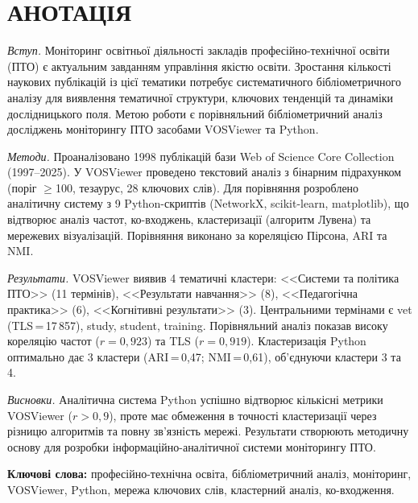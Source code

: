 \section*{\centering \MakeUppercase{Анотація}}

\textit{Вступ.} Моніторинг освітньої діяльності закладів професійно-технічної освіти (ПТО) є актуальним завданням управління якістю освіти. Зростання кількості наукових публікацій із цієї тематики потребує систематичного бібліометричного аналізу для виявлення тематичної структури, ключових тенденцій та динаміки дослідницького поля. Метою роботи є порівняльний бібліометричний аналіз досліджень моніторингу ПТО засобами VOSViewer та Python.

\textit{Методи.} Проаналізовано 1998 публікацій бази Web of Science Core Collection (1997--2025). У VOSViewer проведено текстовий аналіз з бінарним підрахунком (поріг $\geq$100, тезаурус, 28 ключових слів). Для порівняння розроблено аналітичну систему з 9 Python-скриптів (NetworkX, scikit-learn, matplotlib), що відтворює аналіз частот, ко-входжень, кластеризації (алгоритм Лувена) та мережевих візуалізацій. Порівняння виконано за кореляцією Пірсона, ARI та NMI.

\textit{Результати.} VOSViewer виявив 4 тематичні кластери: <<Системи та політика ПТО>> (11 термінів), <<Результати навчання>> (8), <<Педагогічна практика>> (6), <<Когнітивні результати>> (3). Центральними термінами є vet (TLS\,=\,17\,857), study, student, training. Порівняльний аналіз показав високу кореляцію частот ($r = 0{,}923$) та TLS ($r = 0{,}919$). Кластеризація Python оптимально дає 3 кластери (ARI\,=\,0,47; NMI\,=\,0,61), об'єднуючи кластери 3 та 4.

\textit{Висновки.} Аналітична система Python успішно відтворює кількісні метрики VOSViewer ($r > 0{,}9$), проте має обмеження в точності кластеризації через різницю алгоритмів та повну зв'язність мережі. Результати створюють методичну основу для розробки інформаційно-аналітичної системи моніторингу ПТО.

\textbf{Ключові слова:} професійно-технічна освіта, бібліометричний аналіз, моніторинг, VOSViewer, Python, мережа ключових слів, кластерний аналіз, ко-входження.
